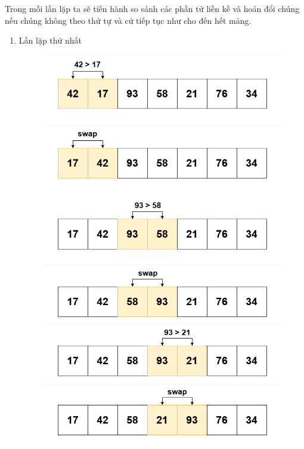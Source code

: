 Trong mỗi lần lặp ta sẽ tiến hành so sánh các phần tử liền kề và hoán đổi chúng nếu chúng không theo thứ tự và cứ tiếp tục như cho đến hết mảng.
\newpage
\begin{enumerate}
    \item Lần lặp thứ nhất
    \begin{figure}[H]
        \centering
        \includegraphics[width=0.75\linewidth]{img/bubble_sort/2.png}
        \includegraphics[width=0.75\linewidth]{img/bubble_sort/3.png}
        \includegraphics[width=0.75\linewidth]{img/bubble_sort/4.png}
        \includegraphics[width=0.75\linewidth]{img/bubble_sort/5.png}
        \includegraphics[width=0.75\linewidth]{img/bubble_sort/6.png}
        \includegraphics[width=0.75\linewidth]{img/bubble_sort/7.png}
    \end{figure}


\end{enumerate}
